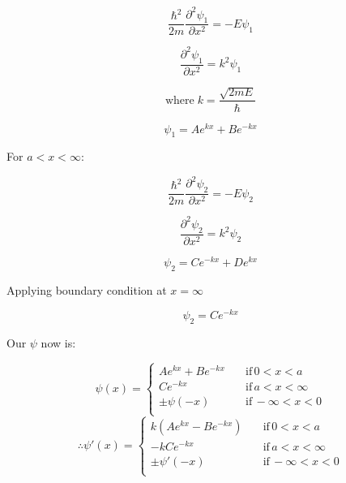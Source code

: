 \documentclass[12pt]{article}
\begin{document}
\begin{enumerate}
          \[
              \frac{\hbar^2}{2m}\frac{\partial^2 \psi_1}{\partial x^2} = -E \psi_1
          \]

          \[
              \frac{\partial^2 \psi_1}{\partial x^2} = k^2 \psi_1
          \]

          \[
              \text{where}\; k = \frac{\sqrt{2m E}}{\hbar}
          \]

          \[
              \psi_1 = A e^{k x} + B e^{- k x}
          \]

          For \(a < x < \infty \):

          \[
              \frac{\hbar^2}{2m}\frac{\partial^2 \psi_2}{\partial x^2} = -E \psi_2
          \]

          \[
              \frac{\partial^2 \psi_2}{\partial x^2} = k^2 \psi_2
          \]

          \[
              \psi_2 = C e^{- k x} + D e^{k x}
          \]

          Applying boundary condition at \(x = \infty \)

          \[
              \psi_2 = C e^{- k x}
          \]

          Our $\psi$ now is:

          \begin{equation*}
              \psi(x) =
              \begin{cases}
                  A e^{k x} + B e^{- k x} \quad & \text{if} \, 0 < x < a        \\
                  C e^{- k x} \quad             & \text{if} \, a < x < \infty   \\
                  \pm \psi(-x) \quad            & \text{if} \, - \infty < x < 0 \\
              \end{cases}
          \end{equation*}
          \begin{equation*}
              \therefore
              \psi'(x) =
              \begin{cases}
                  k (A e^{k x} - B e^{- k x}) \quad & \text{if} \, 0 < x < a        \\
                  -k C e^{- k x} \quad              & \text{if} \, a < x < \infty   \\
                  \pm \psi'(-x) \quad               & \text{if} \, - \infty < x < 0 \\
              \end{cases}
          \end{equation*}


\end{enumerate}
\end{document}
